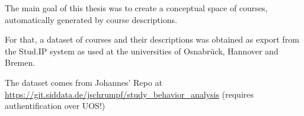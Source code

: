 




The main goal of this thesis was to create a conceptual space of courses, automatically generated by course descriptions.


For that, a dataset of courses and their descriptions was obtained as export from the Stud.IP system as used at the universities of Osnabrück, Hannover and Bremen.

The dataset comes from Johannes' Repo at \url{https://git.siddata.de/jschrumpf/study_behavior_analysis} (requires authentification over UOS!)

